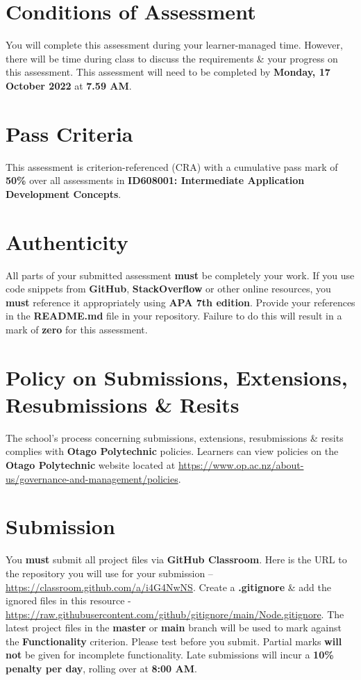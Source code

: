 \documentclass{article}
\begin{document}
\section*{Conditions of Assessment}
You will complete this assessment during your learner-managed time. However, there will be time during class to discuss the requirements \& your progress on this assessment. This assessment will need to be completed by \textbf{Monday, 17 October 2022} at \textbf{7.59 AM}.

\section*{Pass Criteria}
This assessment is criterion-referenced (CRA) with a cumulative pass mark of \textbf{50\%} over all assessments in \textbf{ID608001: Intermediate Application Development Concepts}.

\section*{Authenticity}
All parts of your submitted assessment \textbf{must} be completely your work. If you use code snippets from \textbf{GitHub}, \textbf{StackOverflow} or other online resources, you \textbf{must} reference it appropriately using \textbf{APA 7th edition}. Provide your references in the \textbf{README.md} file in your repository. Failure to do this will result in a mark of \textbf{zero} for this assessment.

\section*{Policy on Submissions, Extensions, Resubmissions \& Resits}
The school's process concerning submissions, extensions, resubmissions \& resits complies with \textbf{Otago Polytechnic} policies. Learners can view policies on the \textbf{Otago Polytechnic} website located at \href{https://www.op.ac.nz/about-us/governance-and-management/policies}{https://www.op.ac.nz/about-us/governance-and-management/policies}.

\section*{Submission}
You \textbf{must} submit all project files via \textbf{GitHub Classroom}. Here is the URL to the repository you will use for your submission – \href{https://classroom.github.com/a/i4G4NwNS}{https://classroom.github.com/a/i4G4NwNS}.  Create a \textbf{.gitignore} \& add the ignored files in this resource - \href{https://raw.githubusercontent.com/github/gitignore/main/Node.gitignore}{https://raw.githubusercontent.com/github/gitignore/main/Node.gitignore}. The latest project files in the \textbf{master} or \textbf{main} branch will be used to mark against the \textbf{Functionality} criterion. Please test before you submit. Partial marks \textbf{will not} be given for incomplete functionality. Late submissions will incur a \textbf{10\% penalty per day}, rolling over at \textbf{8:00 AM}.
\end{document}
